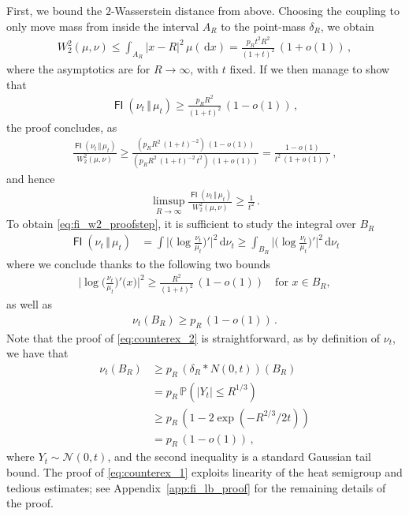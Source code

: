 \documentclass[12pt]{article}
\newcommand{\cN}{\mathcal{N}}
\newcommand{\PP}{\mathbb{P}}
\newcommand{\1}{\mathds{1}}
\newcommand*{\rd}{\mathrm{d}}
\newcommand*{\dd}{\, \rd}
\newcommand{\mmid}{\,\Vert\,}
\DeclareMathOperator*{\FI}{\mathsf{FI}}
\renewcommand{\geq}{\geqslant}
\renewcommand{\ge}{\geqslant}
\renewcommand{\leq}{\leqslant}
\theoremstyle{plain}
\theoremstyle{definition}
\theoremstyle{remark}
\begin{document}
First, we bound the $2$-Wasserstein distance from above. Choosing the coupling to only move mass from inside the interval $A_R$ to the point-mass $\delta_R$, we obtain
\begin{align}\label{eq:counterex_0}
    W_2^2(\mu,\nu) \leq \int_{A_R}|x-R|^2 \,\mu(\!\dd x) = \frac{p_Rt^2 R^2}{(1+t)^2}\,(1+o(1))\,,
\end{align}
where the asymptotics are for $R\to\infty$, with $t$ fixed. If we then manage to show that
\begin{align}\label{eq:fi_w2_proofstep}
    \FI(\nu_t\mmid \mu_t) \geq \frac{p_RR^2}{(1+t)^2}\,(1-o(1))\,,
\end{align}
the proof concludes, as
\begin{align*}
    \frac{\FI(\nu_t\mmid \mu_t)}{W_2^2(\mu,\nu)} \geq \frac{(p_R R^2\,(1+t)^{-2})\,(1-o(1))}{(p_R R^2\,(1+t)^{-2}\,t^2)\,(1+o(1))} =\frac{1-o(1)}{t^2\,(1+o(1))}\,, 
\end{align*}
and hence
\begin{align*}
    \limsup_{R\to\infty} \frac{\FI(\nu_t\mmid\mu_t)}{W_2^2(\mu,\nu)} \ge \frac{1}{t^2}\,.
\end{align*}
To obtain \eqref{eq:fi_w2_proofstep}, it is sufficient to study the integral over $B_R$
\begin{align*}
    \FI(\nu_t\mmid \mu_t)
    &= \int \bigl\lvert \bigl(\log \frac{\nu_t}{\mu_t}\bigr)'\bigr\rvert^2\dd \nu_t
    \ge \int_{B_R} \bigl\lvert \bigl(\log \frac{\nu_t}{\mu_t}\bigr)'\bigr\rvert^2\dd \nu_t
\end{align*}
where we conclude thanks to the following two bounds
\begin{align}\label{eq:counterex_1}
    \bigl\lvert \log \bigl(\frac{\nu_t}{\mu_t}\bigr)'\bigr(x)\rvert^2 
    \ge \frac{R^2}{(1+t)^2}\,(1-o(1))
    \quad \text{for } x \in B_R,
\end{align}
 as well as
\begin{align}\label{eq:counterex_2}
    \nu_t(B_R) \ge p_R\,(1-o(1))\,.
\end{align}
Note that the proof of \eqref{eq:counterex_2} is straightforward, as by definition of $\nu_t$, we have that
\begin{align*}
    \nu_t(B_R) &\geq p_R\, (\delta_R * N(0,t))(B_R) \\
    &= p_R\, \PP(|Y_t| \leq R^{1/3}) \\
    &\geq p_R\,(1 - 2\exp(-R^{2/3}/2t))\\
    &= p_R\,(1 - o(1))\,,
\end{align*}
where $Y_t \sim \cN(0,t)$, and the second inequality is a standard Gaussian tail bound. The proof of \eqref{eq:counterex_1} exploits linearity of the heat semigroup and tedious estimates; see Appendix~\ref{app:fi_lb_proof} for the remaining details of the proof.
\end{document}
